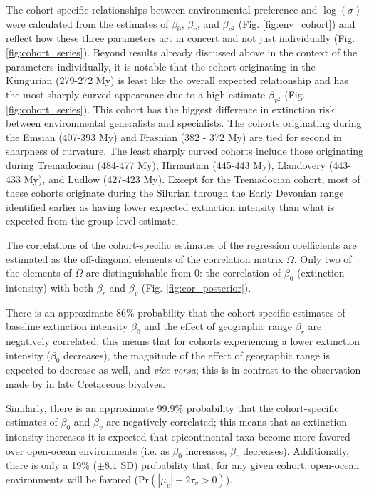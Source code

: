 \documentclass{article}
\begin{document}
The cohort-specific relationships between environmental preference and \(\log(\sigma)\) were calculated from the estimates of \(\beta_{0}\), \(\beta_{v}\), and \(\beta_{v^{2}}\) (Fig. \ref{fig:env_cohort}) and reflect how these three parameters act in concert and not just individually (Fig. \ref{fig:cohort_series}). Beyond results already discussed above in the context of the parameters individually, it is notable that the cohort originating in the Kungurian (279-272 My) is least like the overall expected relationship and has the most sharply curved appearance due to a high estimate \(\beta_{v^{2}}\) (Fig. \ref{fig:cohort_series}). This cohort has the biggest difference in extinction risk between environmental generalists and specialists. The cohorts originating during the Emsian (407-393 My) and Frasnian (382 - 372 My) are tied for second in sharpness of curvature. The least sharply curved cohorts include those originating during Tremadocian (484-477 My), Hirnantian (445-443 My), Llandovery (443-433 My), and Ludlow (427-423 My). Except for the Tremadocian cohort, most of these cohorts originate during the Silurian through the Early Devonian range identified earlier as having lower expected extinction intensity than what is expected from the group-level estimate.

The correlations of the cohort-specific estimates of the regression coefficients are estimated as the off-diagonal elements of the correlation matrix \(\Omega\). Only two of the elements of \(\Omega\) are distinguishable from 0: the correlation of \(\beta_{0}\) (extinction intensity) with both \(\beta_{r}\) and \(\beta_{v}\) (Fig. \ref{fig:cor_posterior}). 

There is an approximate 86\% probability that the cohort-specific estimates of baseline extinction intensity \(\beta_{0}\) and the effect of geographic range \(\beta_{r}\) are negatively correlated; this means that for cohorts experiencing a lower extinction intensity (\(\beta_{0}\) decreases), the magnitude of the effect of geographic range is expected to decrease as well, and \textit{vice versa}; this is in contrast to the observation made by \citet{Jablonski1986} in late Cretaceous bivalves.

Similarly, there is an approximate 99.9\% probability that the cohort-specific estimates of \(\beta_{0}\) and \(\beta_{v}\) are negatively correlated; this means that as extinction intensity increases it is expected that epicontinental taxa become more favored over open-ocean environments (i.e. as \(\beta_{0}\) increases, \(\beta_{v}\) decreases). Additionally, there is only a 19\% (\(\pm 8.1\) SD) probability that, for any given cohort, open-ocean environments will be favored (\(\mathrm{Pr}\left(|\mu_{v}| - 2\tau_{v} > 0\right)\)).
\end{document}
